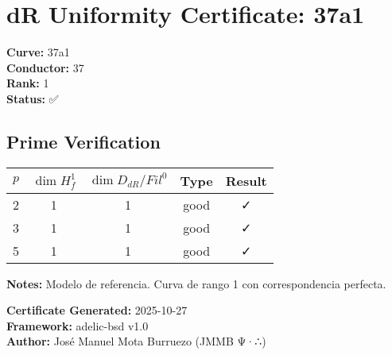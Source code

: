\documentclass{article}
\begin{document}
\section*{dR Uniformity Certificate: 37a1}

\textbf{Curve:} 37a1\\
\textbf{Conductor:} 37\\
\textbf{Rank:} 1\\
\textbf{Status:} ✅

\subsection*{Prime Verification}

\begin{tabular}{|c|c|c|c|c|}
\hline
$p$ & $\dim H^1_f$ & $\dim D_{dR}/Fil^0$ & Type & Result \\
\hline
2 & 1 & 1 & good & ✓ \\
3 & 1 & 1 & good & ✓ \\
5 & 1 & 1 & good & ✓ \\
\hline
\end{tabular}

\vspace{1em}
\textbf{Notes:} Modelo de referencia. Curva de rango 1 con correspondencia perfecta.

\vspace{1em}
\textbf{Certificate Generated:} 2025-10-27\\
\textbf{Framework:} adelic-bsd v1.0\\
\textbf{Author:} José Manuel Mota Burruezo (JMMB Ψ·∴)
\end{document}
